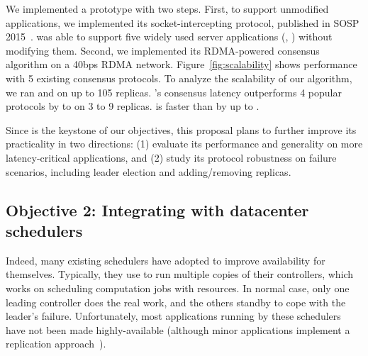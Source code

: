 
 We implemented a \falcon prototype with two steps. First,
to support unmodified applications, we implemented its socket-intercepting protocol,
published in SOSP 2015~\cite{crane:sosp15}. \falcon was able to support five widely
used server applications (\eg, \mysql) without modifying them. Second, we implemented its
RDMA-powered consensus algorithm on a 40bps RDMA network. Figure~\ref{fig:scalability}
shows \falcon performance with 5 existing consensus protocols. To analyze the scalability
of our algorithm, we ran \falcon and \dare on up to 105 replicas. \falcon's consensus latency 
outperforms 4 popular \paxos  protocols by \comptradlow to \comptradhigh on 3 to 9 replicas.
\falcon is  faster than \dare by up to \fasterDARE.



 Since \falcon is the keystone of our objectives, this 
proposal plans to further improve its practicality in two directions: 
(1) evaluate its performance and generality on more latency-critical applications, 
and (2) study its protocol robustness on failure scenarios, including leader
election and adding/removing replicas.

\vspace{-.15in}\subsection{Objective 2: Integrating \falcon with datacenter 
schedulers}\label{sec:scheduler}\vspace{-.075in}

Indeed, many existing schedulers have adopted \paxos to improve availability 
for themselves. Typically, they use \paxos to run multiple copies of their 
controllers, which works on scheduling computation jobs with resources. In 
normal case, only one leading controller does the real work, and the others 
standby to cope with the leader's failure. Unfortunately, most applications 
running by these schedulers have not been made highly-available (although minor 
applications implement a replication 
approach~\cite{mapreduce,dolly:nsdi13}).

